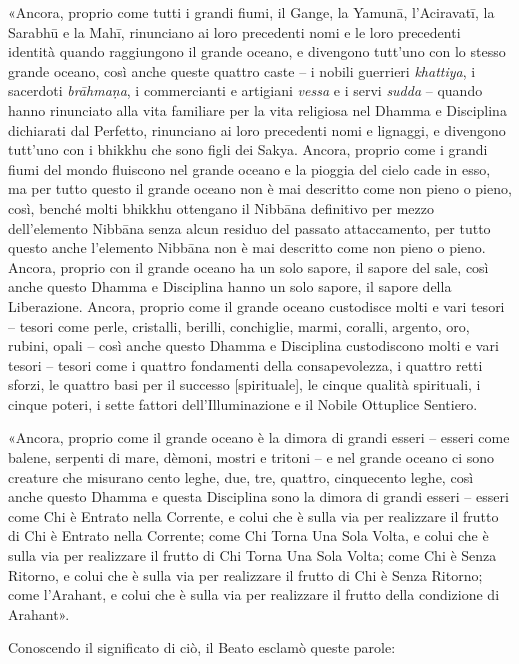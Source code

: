 «Ancora, proprio come tutti i grandi fiumi, il Gange, la Yamunā, l’Aciravatī, la
Sarabhū e la Mahī, rinunciano ai loro precedenti nomi e le loro precedenti
identità quando raggiungono il grande oceano, e divengono tutt’uno con lo stesso
grande oceano, così anche queste quattro caste – i nobili guerrieri
\emph{khattiya}, i sacerdoti \emph{brāhmaṇa}, i commercianti e artigiani
\emph{vessa} e i servi \emph{sudda} – quando hanno rinunciato alla vita
familiare per la vita religiosa nel Dhamma e Disciplina dichiarati dal Perfetto,
rinunciano ai loro precedenti nomi e lignaggi, e divengono tutt’uno con i
bhikkhu che sono figli dei Sakya. Ancora, proprio come i grandi fiumi del mondo
fluiscono nel grande oceano e la pioggia del cielo cade in esso, ma per tutto
questo il grande oceano non è mai descritto come non pieno o pieno, così, benché
molti bhikkhu ottengano il Nibbāna definitivo per mezzo dell’elemento Nibbāna
senza alcun residuo del passato attaccamento, per tutto questo anche l’elemento
Nibbāna non è mai descritto come non pieno o pieno. Ancora, proprio con il
grande oceano ha un solo sapore, il sapore del sale, così anche questo Dhamma e
Disciplina hanno un solo sapore, il sapore della Liberazione. Ancora, proprio
come il grande oceano custodisce molti e vari tesori – tesori come perle,
cristalli, berilli, conchiglie, marmi, coralli, argento, oro, rubini, opali –
così anche questo Dhamma e Disciplina custodiscono molti e vari tesori – tesori
come i quattro fondamenti della consapevolezza, i quattro retti sforzi, le
quattro basi per il successo [spirituale], le cinque qualità spirituali, i
cinque poteri, i sette fattori dell’Illuminazione e il Nobile Ottuplice
Sentiero.

«Ancora, proprio come il grande oceano è la dimora di grandi esseri – esseri
come balene, serpenti di mare, dèmoni, mostri e tritoni – e nel grande oceano ci
sono creature che misurano cento leghe, due, tre, quattro, cinquecento leghe,
così anche questo Dhamma e questa Disciplina sono la dimora di grandi esseri –
esseri come Chi è Entrato nella Corrente, e colui che è sulla via per realizzare
il frutto di Chi è Entrato nella Corrente; come Chi Torna Una Sola Volta, e
colui che è sulla via per realizzare il frutto di Chi Torna Una Sola Volta; come
Chi è Senza Ritorno, e colui che è sulla via per realizzare il frutto di Chi è
Senza Ritorno; come l’Arahant, e colui che è sulla via per realizzare il frutto
della condizione di Arahant».

Conoscendo il significato di ciò, il Beato esclamò queste parole:

